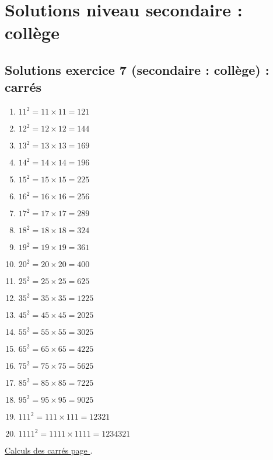 \section{Solutions niveau secondaire : collège}

\newpage 

\subsection{Solutions exercice 7 (secondaire : collège) : carrés}

\label{sol:niveau7}

\begin{enumerate}[label=C\arabic*)]
    \item \(11^2 = 11 \times 11 = 121\)
    \item \(12^2 = 12 \times 12 = 144\)
    \item \(13^2 = 13 \times 13 = 169\)
    \item \(14^2 = 14 \times 14 = 196\)
    \item \(15^2 = 15 \times 15 = 225\)
    \item \(16^2 = 16 \times 16 = 256\)
    \item \(17^2 = 17 \times 17 = 289\)
    \item \(18^2 = 18 \times 18 = 324\)
    \item \(19^2 = 19 \times 19 = 361\)
    \item \(20^2 = 20 \times 20 = 400\)
    \item \(25^2 = 25 \times 25 =  625\)
    \item \(35^2 = 35 \times 35 = 1225\)
    \item \(45^2 = 45 \times 45 = 2025\)
    \item \(55^2 = 55 \times 55 = 3025\)
    \item \(65^2 = 65 \times 65 = 4225\)
    \item \(75^2 = 75 \times 75 = 5625\)
    \item \(85^2 = 85 \times 85 = 7225\)
    \item \(95^2 = 95 \times 95 = 9025\)
    \item \(111^2 = 111 \times 111 = 12321\)
    \item \(1111^2 = 1111 \times 1111 = 1234321\)
\end{enumerate}

\hyperref[calc:niveau7]{Calculs des carrés page \pageref{calc:niveau7}}.


